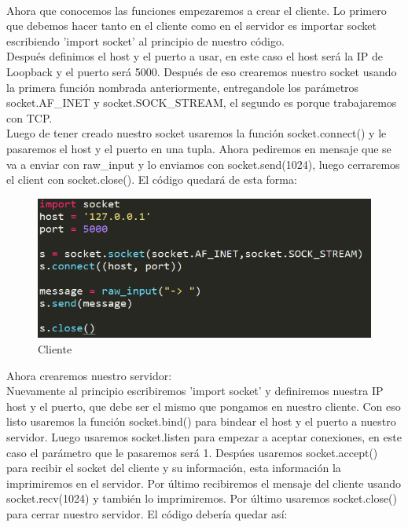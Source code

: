 \documentclass[onecolumn,11pts]{IEEEtran}
\begin{document}
\\Ahora que conocemos las funciones empezaremos a crear el cliente. Lo primero que debemos hacer tanto en el cliente como en el servidor es importar socket escribiendo 'import socket' al principio de nuestro código.\\Después definimos el host y el puerto a usar, en este caso el host será la IP de Loopback y el puerto será 5000. Después de eso crearemos nuestro socket usando la primera función nombrada anteriormente, entregandole los parámetros socket.AF\_INET y socket.SOCK\_STREAM, el segundo es porque trabajaremos con TCP.\\Luego de tener creado nuestro socket usaremos la función socket.connect() y le pasaremos el host y el puerto en una tupla. Ahora pediremos en mensaje que se va a enviar con raw\_input y lo enviamos con socket.send(1024), luego cerraremos el client con socket.close(). El código quedará de esta forma:

\begin{figure}[h!]
\centering
 \includegraphics[scale=0.5]{cliente}
\caption{Cliente}
\label{fig:cliente}
\end{figure}

Ahora crearemos nuestro servidor:\\
Nuevamente al principio escribiremos 'import socket' y definiremos nuestra IP host y el puerto, que debe ser el mismo que pongamos en nuestro cliente. Con eso listo usaremos la función socket.bind() para bindear el host y el puerto a nuestro servidor. Luego usaremos socket.listen para empezar a aceptar conexiones, en este caso el parámetro que le pasaremos será 1. Despúes usaremos socket.accept() para recibir el socket del cliente y su información, esta información la imprimiremos en el servidor. Por último recibiremos el mensaje del cliente usando socket.recv(1024) y también lo imprimiremos. Por último usaremos socket.close() para cerrar nuestro servidor. El código debería quedar así:
\end{document}
